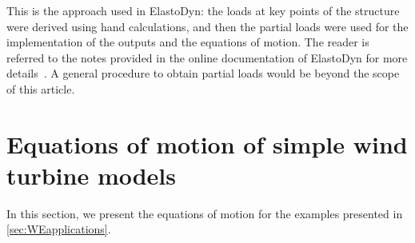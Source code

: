 \documentclass[wes, manuscript]{copernicus}
\renewcommand{\v}[1]{\boldsymbol{#1}}
\newcommand{\todoBoth}    [1]{{\colorbox{yellow}{TODO Both:    }}{\color{red}{#1}}\colorbox{yellow}{/}}
\begin{document}
% 
This is the approach used in ElastoDyn: the loads at key points of the structure were derived using hand calculations, and then the partial loads were used for the implementation of the outputs and the equations of motion. The reader is referred to the notes provided in the online documentation of ElastoDyn for more details~\citep{OpenFAST}. A general procedure to obtain partial loads would be beyond the scope of this article. 
\clearpage







\section{Equations of motion of simple wind turbine models}

In this section, we present the equations of motion for the examples presented in \autoref{sec:WEapplications}. 
   
\end{document}
